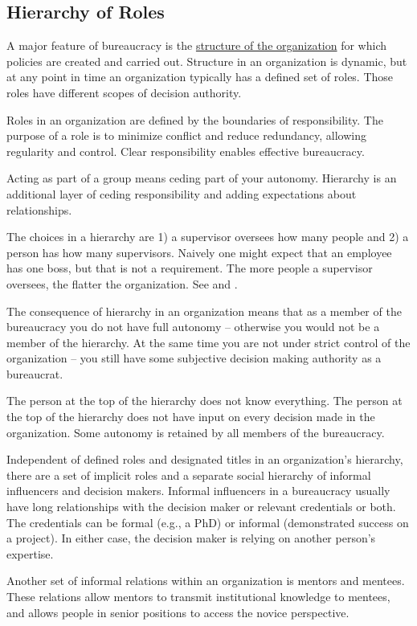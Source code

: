 \subsection{Hierarchy of Roles}
A major feature of bureaucracy is the \href{https://en.wikipedia.org/wiki/Organizational_structure}{structure of the organization} for which policies are created and carried out. Structure in an organization is dynamic, but at any point in time an organization typically has a defined set of roles. Those roles have different scopes of decision authority. 

Roles in an organization are defined by the boundaries of responsibility. The purpose of a role is to minimize conflict and reduce redundancy, allowing regularity and control. Clear responsibility enables effective bureaucracy. 

Acting as part of a group means ceding part of your autonomy. Hierarchy is an additional layer of ceding responsibility and adding expectations about relationships.

The choices in a hierarchy are 1) a supervisor oversees how many people and 2) a person has how many supervisors. Naively one might expect that an employee has one boss, but that is not a requirement. 
The more people a supervisor oversees, the flatter the organization. See \cite{2012_Valve} and \cite{1972_Joreen}.

The consequence of hierarchy in an organization means that as a member of the bureaucracy you do not have full autonomy -- otherwise you would not be a member of the hierarchy. At the same time you are not under strict control of the organization -- you still have some subjective decision making authority as a bureaucrat.

The person at the top of the hierarchy does not know everything. The person at the top of the hierarchy does not have input on every decision made in the organization. Some autonomy is retained by all members of the bureaucracy.

Independent of defined roles and designated titles in an organization's hierarchy, there are a set of implicit roles and a separate social hierarchy of informal influencers and decision makers. Informal influencers in a bureaucracy usually have long relationships with the decision maker or relevant credentials or both. The credentials can be formal (e.g., a PhD) or informal (demonstrated success on a project). In either case, the decision maker is relying on another person's expertise. 

Another set of informal relations within an organization is mentors and mentees. These relations allow mentors to transmit institutional knowledge to mentees, and allows people in senior positions to access the novice perspective. 


